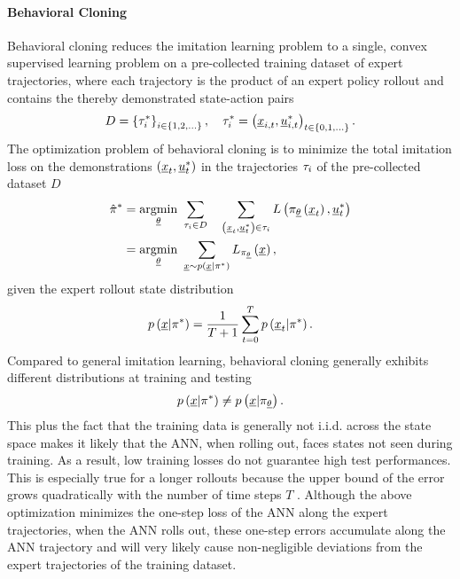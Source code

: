 \paragraph*{Behavioral Cloning}$\ $\\
Behavioral cloning reduces the imitation learning problem 
to a single, convex supervised learning problem 
on a pre-collected training dataset 
of expert trajectories, where each trajectory is the product of an 
expert policy rollout and 
contains the thereby demonstrated state-action pairs
\begin{equation}
    D = \left\{{\tau_i^*}\right\}_{i \in \left\{{1, 2, \dots}\right\}}
    ,\quad
    \tau_i^* = \left({
        \underline{x}_{i,t}, \underline{u}_{i,t}^*}\right)
    _{t \in \left\{{0, 1, \dots}\right\}}.
\end{equation}
The optimization problem of behavioral cloning
is to minimize the 
total imitation loss on the demonstrations
$\left({\underline{x}_t, \underline{u}_t^*}\right)$ 
in the trajectories 
$\tau_i$
of the pre-collected dataset $D$
\begin{align}
    \hat{\pi}^*
    &=
    \underset{\underline{\theta}}{\mathrm{argmin}}\ 
    \sum_{\tau_i \in D} \quad
    \sum_{\left({\underline{x}_t, \underline{u}_t^*}\right) \in \tau_i
    }
    L \left({
        \pi_{\underline{\theta}} \left({\underline{x}_t}\right),
        \underline{u}_t^*
    }\right)
    \nonumber\\ &=
    \underset{\underline{\theta}}{\mathrm{argmin}}\ 
    \sum_{
        \underline{x} \sim p \left({
            \underline{x} | \pi^*}\right)
    }
    L_{\pi_{\underline{\theta}}} \left({\underline{x}}\right)
    ,
\end{align}
given the expert rollout state distribution
\begin{equation}
    p \left({\underline{x} | \pi^*}\right)
    = \frac{1}{T+1} \sum_{t = 0}^T
    p \left({\underline{x}_t | \pi^*}\right).
\end{equation}
Compared to general imitation learning, behavioral cloning 
generally exhibits different distributions at training and testing
\begin{equation}
    p \left({\underline{x} | \pi^*}\right)
    \neq 
    p \left({\underline{x} | \pi_{\underline{\theta}}}\right).
\end{equation}
This plus the fact that the training data is 
generally not i.i.d. across the state space 
makes it likely that the ANN, when rolling out, 
faces states not seen during training. 
As a result, low training losses do not guarantee high test performances. 
This is especially true for a longer rollouts 
because the upper bound of the error grows quadratically 
with the number of time steps $T$ \cite{yue2018imitation}. 
Although the above optimization minimizes 
the one-step loss of the ANN along the expert trajectories, 
when the ANN rolls out, these one-step errors accumulate 
along the ANN trajectory and will very likely 
cause non-negligible deviations from the expert trajectories 
of the training dataset.




